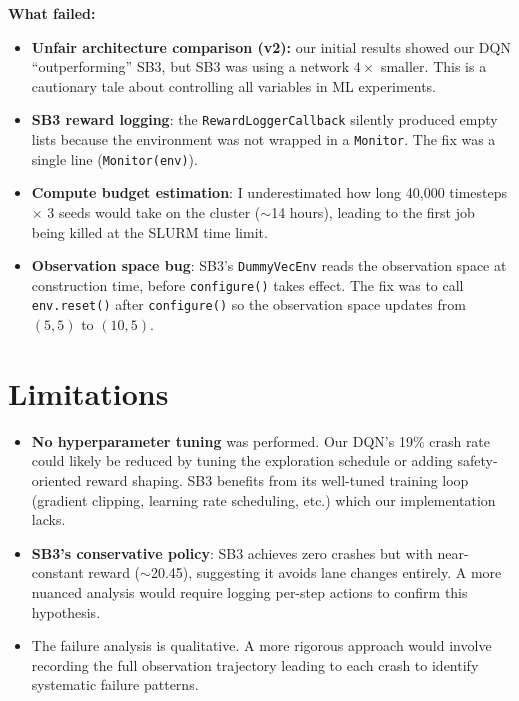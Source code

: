\documentclass[11pt,a4paper]{article}
\begin{document}
\textbf{What failed:}
\begin{itemize}
    \item \textbf{Unfair architecture comparison (v2):} our initial results showed our DQN ``outperforming'' SB3, but SB3 was using a network $4\times$ smaller. This is a cautionary tale about controlling all variables in ML experiments.
    \item \textbf{SB3 reward logging}: the \texttt{RewardLoggerCallback} silently produced empty lists because the environment was not wrapped in a \texttt{Monitor}. The fix was a single line (\texttt{Monitor(env)}).
    \item \textbf{Compute budget estimation}: I underestimated how long 40{,}000 timesteps $\times$ 3 seeds would take on the cluster ($\sim$14 hours), leading to the first job being killed at the SLURM time limit.
    \item \textbf{Observation space bug}: SB3's \texttt{DummyVecEnv} reads the observation space at construction time, before \texttt{configure()} takes effect. The fix was to call \texttt{env.reset()} after \texttt{configure()} so the observation space updates from $(5, 5)$ to $(10, 5)$.
\end{itemize}

\section{Limitations}

\begin{itemize}
    \item \textbf{No hyperparameter tuning} was performed. Our DQN's 19\% crash rate could likely be reduced by tuning the exploration schedule or adding safety-oriented reward shaping. SB3 benefits from its well-tuned training loop (gradient clipping, learning rate scheduling, etc.) which our implementation lacks.
    \item \textbf{SB3's conservative policy}: SB3 achieves zero crashes but with near-constant reward ($\sim$20.45), suggesting it avoids lane changes entirely. A more nuanced analysis would require logging per-step actions to confirm this hypothesis.
    \item The failure analysis is qualitative. A more rigorous approach would involve recording the full observation trajectory leading to each crash to identify systematic failure patterns.
\end{itemize}
\end{document}
